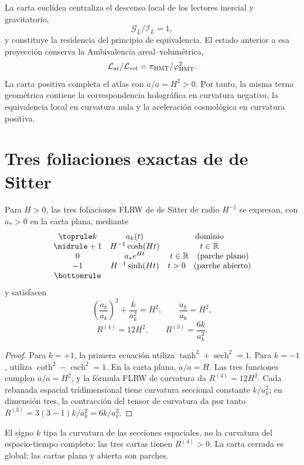 La carta euclídea centraliza el descenso local de los lectores inercial y
gravitatorio,
\[
 \mathcal G_L/\mathcal I_L=1,
\]
y constituye la residencia del principio de equivalencia. El estado anterior
a esa proyección conserva la Ambivalencia areal--volumétrica,
\[
 \mathcal L_{\rm ar}/\mathcal L_{\rm vol}
 =\pi_{\rm HMT}/\varphi_{\rm HMT}^{2}.
\]
La carta positiva completa el atlas con \(\ddot a/a=H^2>0\). Por tanto, la
misma terna geométrica contiene la correspondencia holográfica en curvatura
negativa, la equivalencia local en curvatura nula y la aceleración cosmológica
en curvatura positiva.

\section{Tres foliaciones exactas de de Sitter}
\label{sec:tres-foliaciones-de-sitter}

\begin{proposition}
\label{prop:tres-foliaciones-de-sitter}
Para \(H>0\), las tres foliaciones FLRW de de Sitter de radio \(H^{-1}\)
se expresan, con \(a_\ast>0\) en la carta plana, mediante
\[
\begin{array}{ccc}
\toprule
k&a_k(t)&\text{dominio}\\
\midrule
+1&H^{-1}\cosh(Ht)&t\in\mathbb R\\
0&a_\ast e^{Ht}&t\in\mathbb R\quad\text{(parche plano)}\\
-1&H^{-1}\sinh(Ht)&t>0\quad\text{(parche abierto)}
\\\bottomrule
\end{array}
\]
y satisfacen
\[
\boxed{
\left(\frac{\dot a_k}{a_k}\right)^2+\frac{k}{a_k^2}=H^2,
\qquad
\frac{\ddot a_k}{a_k}=H^2,}
\]
\[
\boxed{
R^{(4)}=12H^2,\qquad
R^{(3)}=\frac{6k}{a_k^2}.}
\]
\end{proposition}

\begin{proof}
Para \(k=+1\), la primera ecuación utiliza
\(\tanh^2+\operatorname{sech}^2=1\). Para \(k=-1\), utiliza
\(\coth^2-\operatorname{csch}^2=1\). En la carta plana,
\(\dot a/a=H\). Las tres funciones cumplen
\(\ddot a/a=H^2\), y la fórmula FLRW de curvatura da
\(R^{(4)}=12H^2\). Cada rebanada espacial tridimensional tiene curvatura
seccional constante \(k/a_k^2\); en dimensión tres, la contracción del tensor
de curvatura da por tanto
\(R^{(3)}=3(3-1)k/a_k^2=6k/a_k^2\).
\end{proof}

El signo \(k\) tipa la curvatura de las secciones espaciales, no la
curvatura del espacio-tiempo completo: las tres cartas tienen
\(R^{(4)}>0\). La carta cerrada es global; las cartas plana y abierta son
parches.

